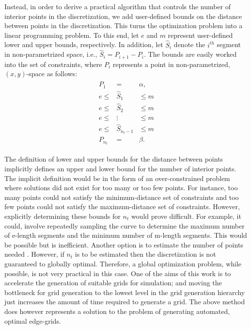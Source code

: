 Instead, in order to derive a practical algorithm that controls the 
number of interior points in the discretization, we add user-defined 
bounds on the distance between points in the discretization.  This turns 
the optimization problem into a linear programming problem.  To this end, 
let $e$ and $m$ represent user-defined lower and upper bounds, 
respectively.  In addition, let $\hat{S}_i$ denote the $i^{th}$ segment 
in non-parametrized space, i.e., $\hat{S}_i = P_{i+1}-P_i$.  The bounds 
are easily worked into the set of constraints, where $P_i$ represents a 
point in non-parametrized, $(x,y)$-space as follows: 
\begin{eqnarray*} 
\begin{array}{rcl} 
P_1 & = & \alpha,\\ 
e \leq & \hat{S}_1 & \leq m \\ 
e \leq & \hat{S}_2 & \leq m \\ 
e \leq & \vdots & \leq m \\ 
e \leq & \hat{S}_{n_t-1} & \leq m \\ 
P_{n_t} & = & \beta. 
\end{array} 
\end{eqnarray*}

The definition of lower and upper bounds for the distance between points 
implicitly defines an upper and lower bound for the number of interior 
points. The implicit definition would be in the form of an 
over-constrained problem where solutions did not exist for too many or too 
few points. For instance, too many points could not satisfy the 
minimum-distance set of constraints and too few points could not satisfy 
the maximum-distance set of constraints. However, explicitly determining 
these bounds for $n_t$ would prove difficult. For example, it could, 
involve repeatedly sampling the curve to determine the maximum number of 
e-length segments and the minimum number of m-length segments. This would 
be possible but is inefficient. Another option is to estimate the number 
of points needed \cite{cuilliere97}. However, if $n_t$ is to be estimated 
then the discretization is not guaranteed to globally optimal. Therefore, 
a global optimization problem, while possible, is not 
very practical in this case. One of the aims of this work is to 
accelerate the generation of suitable grids for simulation; and moving the 
bottleneck for grid generation to the lowest level in the grid generation 
hierarchy just increases the amount of time required to generate a grid. 
The above method does however represents a solution to the problem of 
generating automated, optimal edge-grids.

